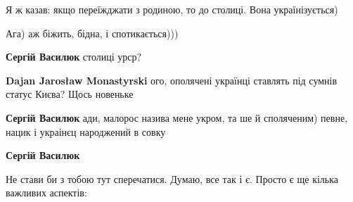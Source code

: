 \begin{itemize}
 
Я ж казав: якщо переїжджати з родиною, то до столиці. Вона українізується)

\begin{itemize}
 
Ага) аж біжить, бідна, і спотикається)))

 
\textbf{Сергій Василюк} столиці урср?

 
\textbf{Dajan Jarosław Monastyrski} ого, ополячені українці ставлять під сумнів статус Києва? Щось новеньке

 
\textbf{Сергій Василюк} ади, малорос назива мене укром, та ше й споляченим) певне, нацик і украінєц народжений в совку

 
\textbf{Сергій Василюк} 

Не стави би з тобою тут сперечатися. Думаю, все так і є. Просто є ще кілька
важливих аспектів:


\end{itemize}
\end{itemize}
